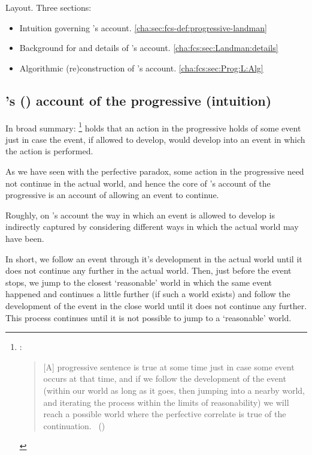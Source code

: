 \begin{note}
  Layout.
  Three sections:
  \begin{itemize}[noitemsep]
  \item
    Intuition governing \citeauthor{Landman:1992wh}'s account.%
    \hfill\autoref{cha:sec:fcs-def:progressive-landman}
  \item
    Background for and details of \citeauthor{Landman:1992wh}'s account.%
    \hfill \autoref{cha:fcs:sec:Landman:details}
  \item
    Algorithmic (re)construction of \citeauthor{Landman:1992wh}'s account.%
    \hfill \autoref{cha:fcs:sec:Prog:L:Alg}
  \end{itemize}
\end{note}



\subsection[\citeauthor{Landman:1992wh}'s account of the progressive (modified)]{\citeauthor{Landman:1992wh}'s (\citeyear{Landman:1992wh}) account of the progressive (intuition)}
\label{cha:sec:fcs-def:progressive-landman}
\nocite{Portner:1998um}
\nocite{Engelberg:1999vi}

\begin{note}
  In broad summary:%
  \footnote{
    \textcite{Szabo:2004ul}:
  \begin{quote}
    [A] progressive sentence is true at some time just in case some event occurs at that time, and if we follow the development of the event (within our world as long as it goes, then jumping into a nearby world, and iterating the process within the limits of reasonability) we will reach a possible world where the perfective correlate is true of the continuation.%
    \mbox{ }\hfill\mbox{(\citeyear[34]{Szabo:2004ul})}
  \end{quote}
  }
  \citeauthor{Landman:1992wh} holds that an action in the progressive holds of some event just in case the event, if allowed to develop, would develop into an event in which the action is performed.

  As we have seen with the perfective paradox, some action in the progressive need not continue in the actual world, and hence the core of \citeauthor{Landman:1992wh}'s account of the progressive is an account of allowing an event to continue.

  Roughly, on \citeauthor{Landman:1992wh}'s account the way in which an event is allowed to develop is indirectly captured by considering different ways in which the actual world may have been.

  In short, we follow an event through it's development in the actual world until it does not continue any further in the actual world.
  Then, just before the event stops, we jump to the closest `reasonable' world in which the same event happened and continues a little further (if such a world exists) and follow the development of the event in the close world until it does not continue any further.
  This process continues until it is not possible to jump to a `reasonable' world.
\end{note}

